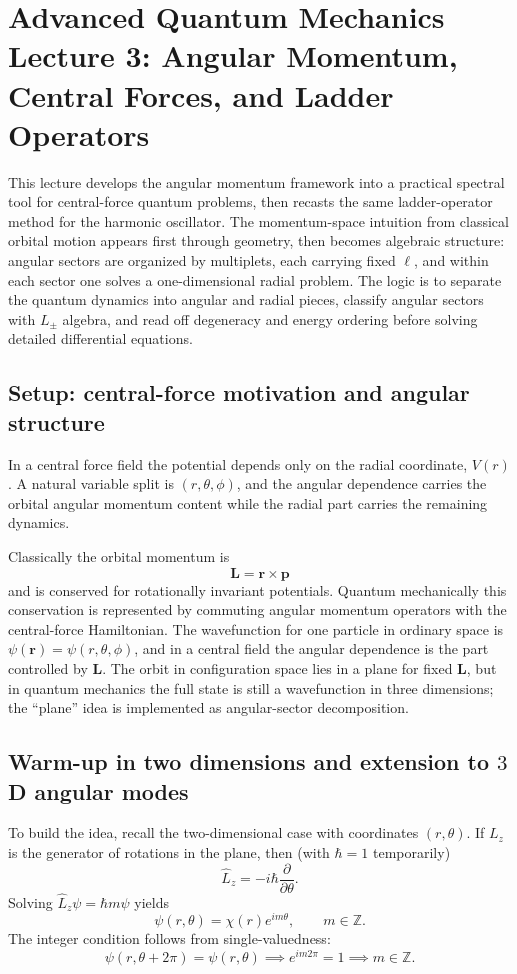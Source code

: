 \chapter{Advanced Quantum Mechanics Lecture 3: Angular Momentum, Central Forces, and Ladder Operators}

This lecture develops the angular momentum framework into a practical spectral tool for central-force quantum problems, then recasts the same ladder-operator method for the harmonic oscillator. The momentum-space intuition from classical orbital motion appears first through geometry, then becomes algebraic structure: angular sectors are organized by multiplets, each carrying fixed \(\ell\), and within each sector one solves a one-dimensional radial problem. The logic is to separate the quantum dynamics into angular and radial pieces, classify angular sectors with \(L_\pm\) algebra, and read off degeneracy and energy ordering before solving detailed differential equations.

\section{Setup: central-force motivation and angular structure}
In a central force field the potential depends only on the radial coordinate, \(V(r)\). A natural variable split is \((r,\theta,\phi)\), and the angular dependence carries the orbital angular momentum content while the radial part carries the remaining dynamics.

Classically the orbital momentum is
\[
\mathbf L=\mathbf r\times \mathbf p
\]
and is conserved for rotationally invariant potentials. Quantum mechanically this conservation is represented by commuting angular momentum operators with the central-force Hamiltonian. The wavefunction for one particle in ordinary space is \(\psi(\mathbf r)=\psi(r,\theta,\phi)\), and in a central field the angular dependence is the part controlled by \(\mathbf L\). The orbit in configuration space lies in a plane for fixed \(\mathbf L\), but in quantum mechanics the full state is still a wavefunction in three dimensions; the “plane” idea is implemented as angular-sector decomposition.

\section{Warm-up in two dimensions and extension to \(3\)D angular modes}
To build the idea, recall the two-dimensional case with coordinates \((r,\theta)\). If \(L_z\) is the generator of rotations in the plane, then (with \(\hbar=1\) temporarily)
\[
\hat L_z=-i\hbar\frac{\partial}{\partial\theta}.
\]
Solving \(\hat L_z\psi=\hbar m\psi\) yields
\[
\psi(r,\theta)=\chi(r)e^{im\theta}, \qquad m\in\mathbb Z.
\]
The integer condition follows from single-valuedness:
\[
\psi(r,\theta+2\pi)=\psi(r,\theta)\implies e^{i m 2\pi}=1\implies m\in\mathbb Z.
\]

